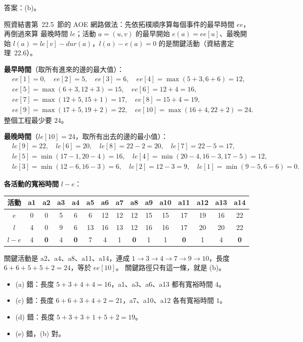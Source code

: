 \begin{pastsoln}
答案：(b)。

照資結書第~22.5~節的 AOE 網路做法：先依拓樸順序算每個事件的最早時間 $\mathit{ee}$，再倒過來算
最晚時間 $\mathit{le}$；活動 $a = (u, v)$ 的最早開始 $e(a) = \mathit{ee}[u]$、最晚開始
$l(a) = \mathit{le}[v] - \mathit{dur}(a)$，$l(a) - e(a) = 0$ 的是關鍵活動（資結書定理~22.6）。

\textbf{最早時間}（取所有進來的邊的最大值）：
\[
\begin{aligned}
&\mathit{ee}[1] = 0,\quad \mathit{ee}[2] = 5,\quad \mathit{ee}[3] = 6,\quad
\mathit{ee}[4] = \max(5 + 3, 6 + 6) = 12,\\
&\mathit{ee}[5] = \max(6 + 3, 12 + 3) = 15,\quad \mathit{ee}[6] = 12 + 4 = 16,\\
&\mathit{ee}[7] = \max(12 + 5, 15 + 1) = 17,\quad \mathit{ee}[8] = 15 + 4 = 19,\\
&\mathit{ee}[9] = \max(17 + 5, 19 + 2) = 22,\quad \mathit{ee}[10] = \max(16 + 4, 22 + 2) = 24.
\end{aligned}
\]
整個工程最少要 $24$。

\textbf{最晚時間}（$\mathit{le}[10] = 24$，取所有出去的邊的最小值）：
\[
\begin{aligned}
&\mathit{le}[9] = 22,\quad \mathit{le}[6] = 20,\quad \mathit{le}[8] = 22 - 2 = 20,\quad
\mathit{le}[7] = 22 - 5 = 17,\\
&\mathit{le}[5] = \min(17 - 1, 20 - 4) = 16,\quad \mathit{le}[4] = \min(20 - 4, 16 - 3, 17 - 5) = 12,\\
&\mathit{le}[3] = \min(12 - 6, 16 - 3) = 6,\quad \mathit{le}[2] = 12 - 3 = 9,\quad
\mathit{le}[1] = \min(9 - 5, 6 - 6) = 0.
\end{aligned}
\]

\textbf{各活動的寬裕時間} $l - e$：
\begin{center}
\small\setlength{\tabcolsep}{4pt}
\begin{tabular}{c*{14}{c}}
\toprule
活動 & a1 & a2 & a3 & a4 & a5 & a6 & a7 & a8 & a9 & a10 & a11 & a12 & a13 & a14 \\
\midrule
$e$ & 0 & 0 & 5 & 6 & 6 & 12 & 12 & 12 & 15 & 15 & 17 & 19 & 16 & 22 \\
$l$ & 4 & 0 & 9 & 6 & 13 & 16 & 13 & 12 & 16 & 16 & 17 & 20 & 20 & 22 \\
$l - e$ & 4 & \textbf{0} & 4 & \textbf{0} & 7 & 4 & 1 & \textbf{0} & 1 & 1 & \textbf{0} & 1 & 4 & \textbf{0} \\
\bottomrule
\end{tabular}
\end{center}
關鍵活動是 a2、a4、a8、a11、a14，連成 $1 \to 3 \to 4 \to 7 \to 9 \to 10$，長度
$6 + 6 + 5 + 5 + 2 = 24$，等於 $\mathit{ee}[10]$。 關鍵路徑只有這一條，就是 (b)。
\begin{itemize}
\item (a) 錯：長度 $5 + 3 + 4 + 4 = 16$，a1、a3、a6、a13 都有寬裕時間 $4$。
\item (c) 錯：長度 $6 + 6 + 3 + 4 + 2 = 21$，a7、a10、a12 各有寬裕時間 $1$。
\item (d) 錯：長度 $5 + 3 + 3 + 1 + 5 + 2 = 19$。
\item (e) 錯，(b) 對。
\end{itemize}
\end{pastsoln}

